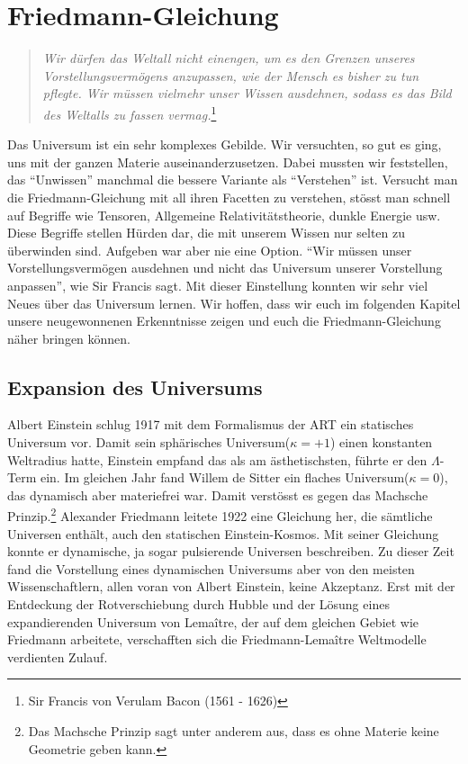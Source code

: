 \chapter{Friedmann-Gleichung\label{chapter:thema}}
\begin{refsection}
\printbibliography[heading=subbibliography]

\rhead{}
\begin{quote}
	\textit{Wir dürfen das Weltall nicht einengen, um es den Grenzen unseres Vorstellungsvermögens anzupassen, wie der Mensch es bisher zu tun pflegte. Wir müssen vielmehr unser Wissen ausdehnen, sodass es das Bild des Weltalls zu fassen vermag.}\footnote{Sir Francis von Verulam Bacon (1561 - 1626)}
\end{quote}
Das Universum ist ein sehr komplexes Gebilde. Wir versuchten, so gut es ging, uns mit der ganzen Materie auseinanderzusetzen. Dabei mussten wir feststellen, das "`Unwissen"' manchmal die bessere Variante als "`Verstehen"' ist. Versucht man die Friedmann-Gleichung mit all ihren Facetten zu verstehen, stösst man schnell auf Begriffe wie Tensoren, Allgemeine Relativitätstheorie, dunkle Energie usw. Diese Begriffe stellen Hürden dar, die mit unserem Wissen nur selten zu überwinden sind. Aufgeben war aber nie eine Option. "`Wir müssen unser Vorstellungsvermögen ausdehnen und nicht das Universum unserer Vorstellung anpassen"', wie Sir Francis sagt. Mit dieser Einstellung konnten wir sehr viel Neues über das Universum lernen. Wir hoffen, dass wir euch im folgenden Kapitel unsere neugewonnenen Erkenntnisse zeigen  und euch die Friedmann-Gleichung näher bringen können.

\section{Expansion des Universums}
Albert Einstein schlug 1917 mit dem Formalismus der ART ein statisches Universum vor. Damit sein sphärisches Universum($\kappa = +1$) einen konstanten Weltradius hatte, Einstein empfand das als am ästhetischsten,  führte er den $\Lambda$-Term ein. Im gleichen Jahr fand Willem de Sitter ein flaches Universum($\kappa = 0$), das dynamisch aber materiefrei war. Damit verstösst es gegen das Machsche Prinzip.\footnote{Das Machsche Prinzip sagt unter anderem aus, dass es ohne Materie keine Geometrie geben kann.} Alexander Friedmann leitete 1922 eine Gleichung her, die sämtliche Universen enthält, auch den statischen Einstein-Kosmos. Mit seiner Gleichung konnte er dynamische, ja sogar pulsierende Universen beschreiben. Zu dieser Zeit fand die Vorstellung eines dynamischen Universums aber von den meisten Wissenschaftlern, allen voran von Albert Einstein, keine Akzeptanz. Erst mit der Entdeckung der Rotverschiebung durch Hubble und der Lösung eines expandierenden Universum von Lema\^{i}tre, der auf dem gleichen Gebiet wie Friedmann arbeitete, verschafften sich die Friedmann-Lema\^{i}tre Weltmodelle verdienten Zulauf.
 

\end{refsection}
